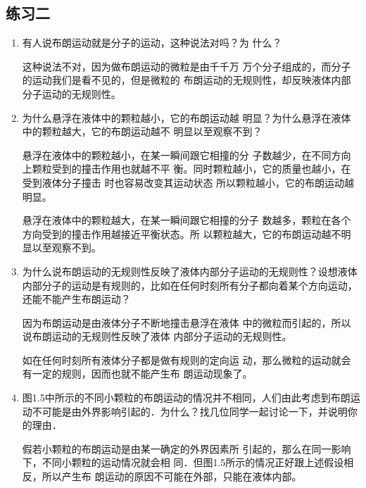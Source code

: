 \subsection{练习二}
\begin{enumerate}
\item 有人说布朗运动就是分子的运动，这种说法对吗？为
什么？

\begin{solution}
这种说法不对，因为做布朗运动的微粒是由千千万
万个分子组成的，而分子的运动我们是看不见的，但是微粒的
布朗运动的无规则性，却反映液体内部分子运动的无规则性。
\end{solution}

\item 为什么悬浮在液体中的颗粒越小，它的布朗运动越
明显？为什么悬浮在液体中的颗粒越大，它的布朗运动越不
明显以至观察不到？

\begin{solution}
悬浮在液体中的颗粒越小，在某一瞬间跟它相撞的分
子数越少，在不同方向上颗粒受到的撞击作用也就越不平
衡。同时颗粒越小，它的质量也越小，在受到液体分子撞击
时也容易改变其运动状态 所以颗粒越小，它的布朗运动越
明显。

悬浮在液体中的颗粒越大，在某一瞬间跟它相撞的分子
数越多，颗粒在各个方向受到的撞击作用越接近平衡状态。所
以颗粒越大，它的布朗运动越不明显以至观察不到。
\end{solution}

\item 为什么说布朗运动的无规则性反映了液体内部分子运动的无规则性？设想液体内部分子的运动是有规则的，比如在任何时刻所有分子都向着某个方向运动，还能不能产生布朗运动？

\begin{solution}
    因为布朗运动是由液体分子不断地撞击悬浮在液体
中的微粒而引起的，所以说布朗运动的无规则性反映了液体
内部分子运动的无规则性。

如在任何时刻所有液体分子都是做有规则的定向运
动，那么微粒的运动就会有一定的规则，因而也就不能产生布
朗运动现象了。
\end{solution}

\item  图1.5中所示的不同小颗粒的布朗运动的情况并不相同，人们由此考虑到布朗运动不可能是由外界影响引起的．为什么？找几位同学一起讨论一下，并说明你的理由．

\begin{solution}
    假若小颗粒的布朗运动是由某一确定的外界因素所
引起的，那么在同一影响下，不同小颗粒的运动情况就会相
同．但图1.5所示的情况正好跟上述假设相反，所以产生布
朗运动的原因不可能在外部，只能在液体内部。
\end{solution}

\end{enumerate}

